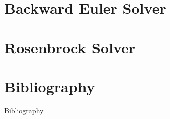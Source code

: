 \documentclass{beamer}
\begin{document}
\section{Backward Euler Solver}

\section{Rosenbrock Solver}

\nocite{SanduI}
\nocite{SanduII}
\nocite{ODEsI}
\nocite{ODEsII}

\section{Bibliography}
\begin{frame}[allowframebreaks]{Bibliography}


\end{frame}
\end{document}
